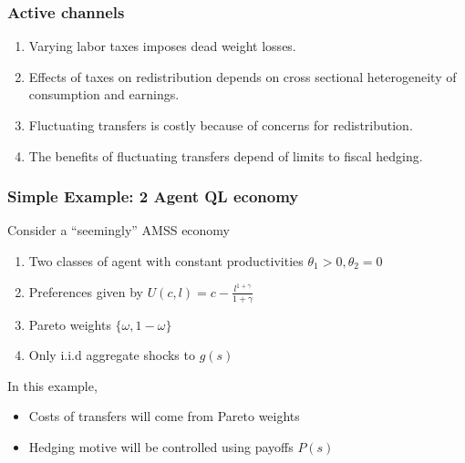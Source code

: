 \documentclass{beamer}
\begin{document}
\begin{frame}
 \frametitle{Active channels}
  \begin{enumerate}
\item Varying labor taxes imposes dead weight losses.


\item Effects of taxes on redistribution depends on cross sectional heterogeneity of consumption and earnings.

\item Fluctuating transfers is costly because of concerns for redistribution. 

\item The benefits of fluctuating transfers depend of limits to fiscal hedging.

\end{enumerate}

 \end{frame}


\begin{frame}
 \frametitle{Simple Example: 2 Agent QL economy}
 Consider a ``seemingly'' AMSS economy
 \begin{enumerate}
  \item Two classes of agent with constant productivities $\theta_1>0,\theta_2=0$
  \item Preferences given by $U(c,l)=c-\frac{l^{1+\gamma}}{1+\gamma}$
  \item Pareto weights $\{\omega,1-\omega\}$
  \item Only i.i.d aggregate shocks to $g(s)$
 \end{enumerate}
 
  
  In this example, 
  \begin{itemize}
   
   \item Costs of transfers will come from Pareto weights
   \item Hedging motive will be controlled using payoffs $P(s)$
  \end{itemize}


\end{frame}
\end{document}

